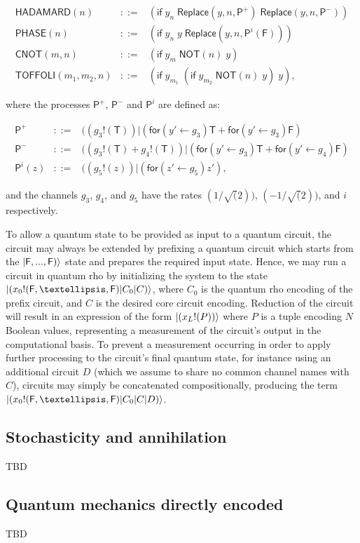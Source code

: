 \begin{eqnarray}
\mathsf{HADAMARD}(n) &::=& (\mathsf{if} \; y_n \; \mathsf{Replace}(y,n,\mathsf{P}^+) \; \mathsf{Replace}(y,n,\mathsf{P}^-)) \nonumber \\
\mathsf{PHASE}(n) &::=& (\mathsf{if} \; y_n \; y \; \mathsf{Replace}(y,n,\mathsf{P}^i(\mathsf{F}))) \nonumber \\
\mathsf{CNOT}(m,n) &::=& (\mathsf{if} \; y_m \; \mathsf{NOT}(n) \; y) \nonumber \\
\mathsf{TOFFOLI}(m_1,m_2,n) &::=& (\mathsf{if} \; y_{m_1} \; (\mathsf{if} \; y_{m_2} \; \mathsf{NOT}(n) \; y) \; y),
\end{eqnarray}

\noindent where the processes $\mathsf{P}^+$, $\mathsf{P}^-$ and $\mathsf{P}^i$ are defined as:

\begin{eqnarray}
\mathsf{P}^+ &::=& ((g_3 \mathsf{!} (\mathsf{T})) \mathsf{|} (\mathsf{for}(y'\leftarrow g_3)\mathsf{T} + \mathsf{for}(y'\leftarrow g_3)\mathsf{F}) \nonumber \\
\mathsf{P}^- &::=& ((g_3 \mathsf{!} (\mathsf{T}) + g_4 \mathsf{!} (\mathsf{T})) \mathsf{|} (\mathsf{for}(y'\leftarrow g_3)\mathsf{T} + \mathsf{for}(y'\leftarrow g_4)\mathsf{F}) \nonumber \\
\mathsf{P}^i(z) &::=& ((g_5 \mathsf{!} (z)) \mathsf{|} (\mathsf{for}(z'\leftarrow g_5)z'),
\end{eqnarray}

\noindent and the channels $g_3$, $g_4$, and $g_5$ have the rates $(1/\sqrt(2))$, $(-1/\sqrt(2))$, and $i$ respectively. 

To allow a quantum state to be provided as input to a quantum circuit, the circuit may always be extended by prefixing a quantum circuit which starts from the $\ket{\mathsf{F},...,\mathsf{F})}$  state and prepares the required input state.  Hence, we may run a circuit in quantum rho by initializing the system to the state $\ket{(x_0 \mathsf{!}(\mathsf{F},…,\mathsf{F})\mathsf{|}C_0 \mathsf{|}C)}$, where  $C_0$ is the quantum rho encoding of the prefix circuit, and $C$ is the desired core circuit encoding.  Reduction of the circuit will result in an expression of the form $\ket{(x_L \mathsf{!}(P))}$ where $P$ is a tuple encoding $N$ Boolean values, representing a measurement of the circuit’s output in the computational basis.  To prevent a measurement occurring in order to apply further processing to the circuit’s final quantum state, for instance using an additional circuit $D$ (which we assume to share no common channel names with $C$), circuits may simply be concatenated compositionally, producing the term $\ket{(x_0 \mathsf{!}(\mathsf{F},…,\mathsf{F})|C_0 |C|D)}$.

\subsection{Stochasticity and annihilation}

TBD

\subsection{Quantum mechanics directly encoded}

TBD
